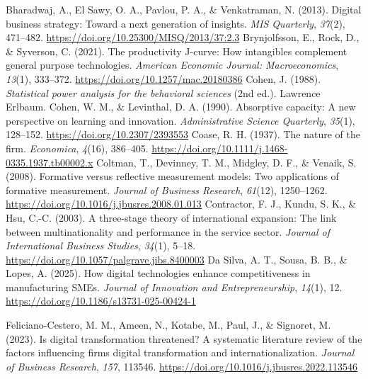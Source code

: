 \documentclass[12pt,a4paper]{article}
\begin{document}
Bharadwaj, A., El Sawy, O. A., Pavlou, P. A., \& Venkatraman, N. (2013).
Digital business strategy: Toward a next generation of insights.
\emph{MIS Quarterly}, \emph{37}(2), 471--482.
\url{https://doi.org/10.25300/MISQ/2013/37:2.3} Brynjolfsson, E., Rock,
D., \& Syverson, C. (2021). The productivity J-curve: How intangibles
complement general purpose technologies. \emph{American Economic
Journal: Macroeconomics}, \emph{13}(1), 333--372.
\url{https://doi.org/10.1257/mac.20180386} Cohen, J. (1988).
\emph{Statistical power analysis for the behavioral sciences} (2nd ed.).
Lawrence Erlbaum. Cohen, W. M., \& Levinthal, D. A. (1990). Absorptive
capacity: A new perspective on learning and innovation.
\emph{Administrative Science Quarterly}, \emph{35}(1), 128--152.
\url{https://doi.org/10.2307/2393553} Coase, R. H. (1937). The nature of
the firm. \emph{Economica}, \emph{4}(16), 386--405.
\url{https://doi.org/10.1111/j.1468-0335.1937.tb00002.x} Coltman, T.,
Devinney, T. M., Midgley, D. F., \& Venaik, S. (2008). Formative versus
reflective measurement models: Two applications of formative
measurement. \emph{Journal of Business Research}, \emph{61}(12),
1250--1262. \url{https://doi.org/10.1016/j.jbusres.2008.01.013}
Contractor, F. J., Kundu, S. K., \& Hsu, C.-C. (2003). A three-stage
theory of international expansion: The link between multinationality and
performance in the service sector. \emph{Journal of International
Business Studies}, \emph{34}(1), 5--18.
\url{https://doi.org/10.1057/palgrave.jibs.8400003} Da Silva, A. T.,
Sousa, B. B., \& Lopes, A. (2025). How digital technologies enhance
competitiveness in manufacturing SMEs. \emph{Journal of Innovation and
Entrepreneurship}, \emph{14}(1), 12.
\url{https://doi.org/10.1186/s13731-025-00424-1}

Feliciano-Cestero, M. M., Ameen, N., Kotabe, M., Paul, J., \& Signoret,
M. (2023). Is digital transformation threatened? A systematic literature
review of the factors influencing firms\textquotesingle{} digital
transformation and internationalization. \emph{Journal of Business
Research}, \emph{157}, 113546.
\url{https://doi.org/10.1016/j.jbusres.2022.113546}
\end{document}
